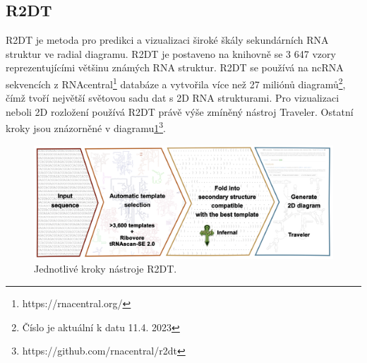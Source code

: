 \subsection{R2DT} \label{r2dt}

R2DT\cite{R2DT2021} je metoda pro predikci a vizualizaci široké škály
sekundárních RNA struktur ve radial diagramu. R2DT je postaveno na knihovně se
3 647 vzory reprezentujícími většinu známých RNA struktur. R2DT se používá na
ncRNA sekvencích z RNAcentral\footnote{https://rnacentral.org/} databáze a
vytvořila více než 27 miliónů diagramů\footnote{Číslo je aktuální k datu 11.4.
2023}, čímž tvoří největší světovou sadu dat s 2D RNA strukturami. Pro
vizualizaci neboli 2D rozložení používá R2DT právě výše zmíněný nástroj
Traveler. Ostatní kroky jsou znázorněné v
diagramu\ref{pipe}\footnote{https://github.com/rnacentral/r2dt}.

\begin{figure}[H]
  \centering
  \includegraphics[width=140mm]{../img/kap01/traveler/pipe.png}
  \caption[Jednotlivé kroky nástroje R2DT]{Jednotlivé kroky nástroje R2DT.}
  \label{pipe}
\end{figure}
